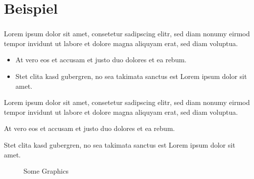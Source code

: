 
\section{Beispiel}

\begin{frame}
	\frametitle{\secname}
	Lorem ipsum dolor sit amet, consetetur sadipscing elitr, sed diam nonumy eirmod tempor invidunt ut labore et dolore magna aliquyam erat, sed diam voluptua.
	\begin{itemize}
		\item At vero eos et accusam et justo duo dolores et ea rebum.
		\item Stet clita kasd gubergren, no sea takimata sanctus est Lorem ipsum dolor sit amet.
	\end{itemize}
\end{frame}

\begin{frame}
	\begin{problem}
		Lorem ipsum dolor sit amet, consetetur sadipscing elitr, sed diam nonumy eirmod tempor invidunt ut labore et dolore magna aliquyam erat, sed diam voluptua.
	\end{problem}
\end{frame}

\begin{frame}
	\begin{satz}
		At vero eos et accusam et justo duo dolores et ea rebum.
	\end{satz}
	\begin{beweis}
		Stet clita kasd gubergren, no sea takimata sanctus est Lorem ipsum dolor sit amet.
	\end{beweis}
\end{frame}

\begin{frame}[fragile]
	\begin{figure}
		\caption{Some Graphics}
	\end{figure}
\end{frame}
